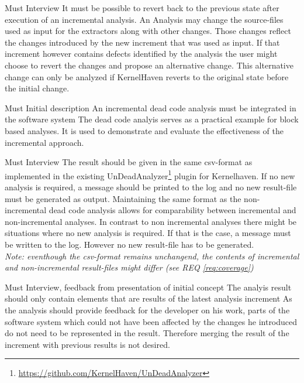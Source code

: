 \documentclass[a4paper]{article}
\begin{document}
\begin{req} \label{req:rollback}
\reqtable
	{Must}  {Interview}
	{It must be possible to revert back to the previous state after execution of an incremental analysis.}
	{An Analysis may change the source-files used as input for the extractors along with other changes. Those changes reflect the changes introduced by the new increment that was used as input. If that increment however contains defects identified by the analysis the user might choose to revert the changes and propose an alternative change. This alternative change can only be analyzed if KernelHaven reverts to the original state before the initial change.}

\end{req}

\begin{req} 
\reqtable
	{Must}  {Initial description}
	{An incremental dead code analysis must be integrated in the software system}
	{The dead code analyis serves as a practical example for block based analyses. It is used to demonstrate and evaluate the effectiveness of the incremental approach.}
	
	

	
	\begin{subreq} \label{req:format}
    \reqtable
    {Must}  {Interview}
	{The result should be given in the same csv-format as implemented in the existing UnDeadAnalyzer\footnote{\url{https://github.com/KernelHaven/UnDeadAnalyzer}} plugin for Kernelhaven. If no new analysis is required, a message should be printed to the log and no new result-file must be generated as output.}
	{Maintaining the same format as the non-incremental dead code analysis allows for comparability between incremental and non-incremental analyses. In contrast to non incremental analyses there might be situations where no new analysis is required. If that is the case, a message must be written to the log. However no new result-file has to be generated. \\
	\emph{Note: eventhough the csv-format remains unchangend, the contents of incremental and non-incremental result-files might differ (see REQ \ref{req:coverage})}}
	\end{subreq}
	
	\begin{subreq} \label{req:coverage}
    \reqtable
    {Must}  {Interview, feedback from presentation of initial concept}
	{The analyis result should only contain elements that are results of the latest analysis increment}
	{As the analysis should provide feedback for the developer on his work, parts of the software system which could not have been affected by the changes he introduced do not need to be represented in the result. Therefore merging the result of the increment with previous results is not desired.}
	\end{subreq}
\end{req}
\end{document}
